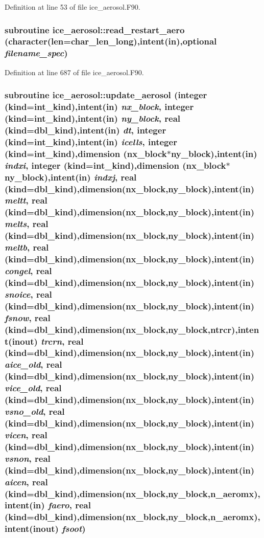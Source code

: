 Definition at line 53 of file ice\_\-aerosol.F90.\hypertarget{namespaceice__aerosol_a423573cf8f7630b777b38860c81adfb0}{
\subsubsection[{read\_\-restart\_\-aero}]{\setlength{\rightskip}{0pt plus 5cm}subroutine ice\_\-aerosol::read\_\-restart\_\-aero (character(len=char\_\-len\_\-long),intent(in),optional {\em filename\_\-spec})}}
\label{namespaceice__aerosol_a423573cf8f7630b777b38860c81adfb0}


Definition at line 687 of file ice\_\-aerosol.F90.\hypertarget{namespaceice__aerosol_a11451c6ed657ce27ffdd01d6c3db0ed4}{
\subsubsection[{update\_\-aerosol}]{\setlength{\rightskip}{0pt plus 5cm}subroutine ice\_\-aerosol::update\_\-aerosol (integer (kind=int\_\-kind),intent(in) {\em nx\_\-block}, \/  integer (kind=int\_\-kind),intent(in) {\em ny\_\-block}, \/  real (kind=dbl\_\-kind),intent(in) {\em dt}, \/  integer (kind=int\_\-kind),intent(in) {\em icells}, \/  integer (kind=int\_\-kind),dimension (nx\_\-block$\ast$ny\_\-block),intent(in) {\em indxi}, \/  integer (kind=int\_\-kind),dimension (nx\_\-block$\ast$ny\_\-block),intent(in) {\em indxj}, \/  real (kind=dbl\_\-kind),dimension(nx\_\-block,ny\_\-block),intent(in) {\em meltt}, \/  real (kind=dbl\_\-kind),dimension(nx\_\-block,ny\_\-block),intent(in) {\em melts}, \/  real (kind=dbl\_\-kind),dimension(nx\_\-block,ny\_\-block),intent(in) {\em meltb}, \/  real (kind=dbl\_\-kind),dimension(nx\_\-block,ny\_\-block),intent(in) {\em congel}, \/  real (kind=dbl\_\-kind),dimension(nx\_\-block,ny\_\-block),intent(in) {\em snoice}, \/  real (kind=dbl\_\-kind),dimension(nx\_\-block,ny\_\-block),intent(in) {\em fsnow}, \/  real (kind=dbl\_\-kind),dimension(nx\_\-block,ny\_\-block,ntrcr),intent(inout) {\em trcrn}, \/  real (kind=dbl\_\-kind),dimension(nx\_\-block,ny\_\-block),intent(in) {\em aice\_\-old}, \/  real (kind=dbl\_\-kind),dimension(nx\_\-block,ny\_\-block),intent(in) {\em vice\_\-old}, \/  real (kind=dbl\_\-kind),dimension(nx\_\-block,ny\_\-block),intent(in) {\em vsno\_\-old}, \/  real (kind=dbl\_\-kind),dimension(nx\_\-block,ny\_\-block),intent(in) {\em vicen}, \/  real (kind=dbl\_\-kind),dimension(nx\_\-block,ny\_\-block),intent(in) {\em vsnon}, \/  real (kind=dbl\_\-kind),dimension(nx\_\-block,ny\_\-block),intent(in) {\em aicen}, \/  real (kind=dbl\_\-kind),dimension(nx\_\-block,ny\_\-block,n\_\-aeromx),intent(in) {\em faero}, \/  real (kind=dbl\_\-kind),dimension(nx\_\-block,ny\_\-block,n\_\-aeromx),intent(inout) {\em fsoot})}}
\label{namespaceice__aerosol_a11451c6ed657ce27ffdd01d6c3db0ed4}


